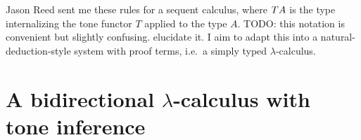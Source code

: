 \documentclass[ribbons]{rntz}
\newcommand{\todo}[1]{{\color{Purple}#1}}
\newcommand{\mb}[1]{\ensuremath{\mathbf{#1}}}
\begin{document}
Jason Reed sent me these rules for a sequent calculus, where $T A$ is the
type internalizing the tone functor $T$ applied to the type $A$. \todo{TODO:
  this notation is convenient but slightly confusing. elucidate it.} I aim to
adapt this into a natural-deduction-style system with proof terms, i.e.\ a
simply typed $\lambda$-calculus.


\section{A bidirectional \texorpdfstring{$\lambda$}{lambda}-calculus with tone inference}

\newcommand{\tpcolor}{}%
\newcommand{\tmcolor}{}%
\newcommand{\cxcolor}{}%

\newcommand{\subtype}{\le}
\newcommand{\strips}{\prec}

\newcommand{\uh}[2]{#1 : #2}            %
\newcommand{\h}[3]{\uh{#1}{\mtp{#2}{#3}}}
\newcommand{\infers}[3]{{\tmcolor#1} \Rightarrow {\cxcolor#2} \vdash {\tpcolor#3}}
\newcommand{\checks}[3]{{\tmcolor#1} \Leftarrow {\cxcolor#2} \vdash {\tpcolor#3}}

\newcommand{\ein}[2]{\textsf{in}_{#1}\:{#2}}
\newcommand{\cto}{\shortrightarrow}
\newcommand{\ecase}[1]{\mb{case}~{#1}~\mb{of}~\,}
\newcommand{\emptycx}{\varepsilon}

\newcommand{\mdist}[2]{#1 \equiv #2}
\newcommand{\mbinop}{\oast}
\newcommand{\adjoint}[2]{#1 \dashv #2}


\end{document}
